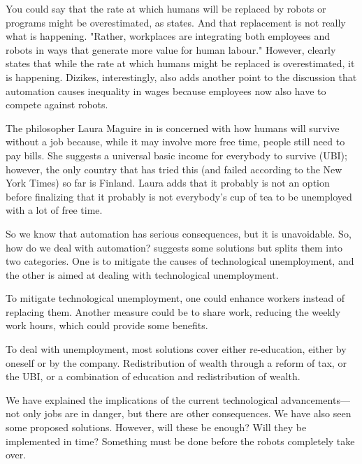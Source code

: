 \documentclass[a4paper, 14pt]{extarticle}
\begin{document}
\begin{flushleft}
You could say that the rate at which humans will be replaced by robots or programs might be overestimated, as \cite{sciencedaily} states. And that replacement is not really what is happening. "Rather, workplaces are integrating both employees and robots in ways that generate more value for human labour." However, \cite{PDizikes2020} clearly states that while the rate at which humans might be replaced is overestimated, it is happening. Dizikes, interestingly, also adds another point to the discussion that automation causes inequality in wages because employees now also have to compete against robots.
\end{flushleft}
\begin{flushleft}
The philosopher Laura Maguire in \cite{philo} is concerned with how humans will survive without a job because, while it may involve more free time, people still need to pay bills. She suggests a universal basic income for everybody to survive (UBI); however, the only country that has tried this (and failed according to the New York Times) so far is Finland. Laura adds that it probably is not an option before finalizing that it probably is not everybody's cup of tea to be unemployed with a lot of free time.
\end{flushleft}
So we know that automation has serious consequences, but it is unavoidable. So, how do we deal with automation? \cite{mdpi} suggests some solutions but splits them into two categories. One is to mitigate the causes of technological unemployment, and the other is aimed at dealing with technological unemployment.
\begin{flushleft}
To mitigate technological unemployment, one could enhance workers instead of replacing them. Another measure could be to share work, reducing the weekly work hours, which could provide some benefits.
\end{flushleft}
\begin{flushleft}
To deal with unemployment, most solutions cover either re-education, either by oneself or by the company. Redistribution of wealth through a reform of tax, or the UBI, or a combination of education and redistribution of wealth.
\end{flushleft}
\begin{flushleft}
We have explained the implications of the current technological advancements—not only jobs are in danger, but there are other consequences. We have also seen some proposed solutions. However, will these be enough? Will they be implemented in time? Something must be done before the robots completely take over.
\end{flushleft}
\printbibliography
\end{document}
